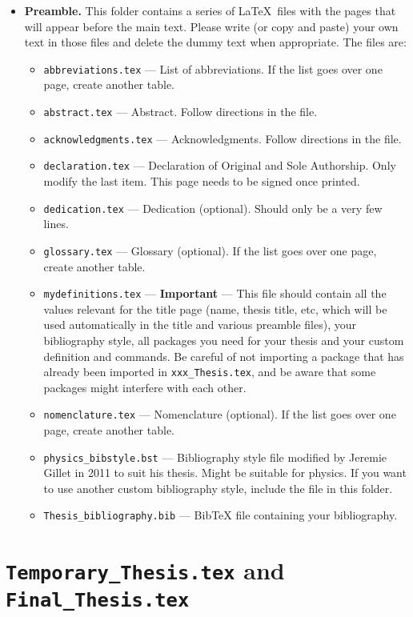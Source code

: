 \begin{itemize}
\item \textbf{Preamble.} This folder contains a series of \LaTeX\ files with the pages that will appear before the main text. Please write (or copy and paste) your own text in those files and delete the dummy text when appropriate. The files are:
\begin{itemize}
\item \texttt{abbreviations.tex} --- List of abbreviations. If the list goes over one page, create another table.
\item \texttt{abstract.tex} --- Abstract. Follow directions in the file.
\item \texttt{acknowledgments.tex} --- Acknowledgments. Follow directions in the file.
\item \texttt{declaration.tex} --- Declaration of Original and Sole Authorship. Only modify the last item. This page needs to be signed once printed.
\item \texttt{dedication.tex} --- Dedication (optional). Should only be a very few lines.
\item \texttt{glossary.tex} --- Glossary (optional). If the list goes over one page, create another table.
\item \texttt{mydefinitions.tex} --- \textbf{Important} --- This file should contain all the values relevant for the title page (name, thesis title, etc, which will be used automatically in the title and various preamble files), your bibliography style, all packages you need for your thesis and your custom definition and commands. Be careful of not importing a package that has already been imported in \texttt{xxx\_Thesis.tex}, and be aware that some packages might interfere with each other.
\item \texttt{nomenclature.tex} --- Nomenclature (optional). If the list goes over one page, create another table.
\item \texttt{physics\_bibstyle.bst} --- Bibliography style file modified by Jeremie Gillet in 2011 to suit his thesis. Might be suitable for physics. If you want to use another custom bibliography style, include the file in this folder.
\item \texttt{Thesis\_bibliography.bib} --- BibTeX file containing your bibliography.
\end{itemize}

\end{itemize}

\section{\texttt{Temporary\_Thesis.tex} and  \texttt{Final\_Thesis.tex}}

